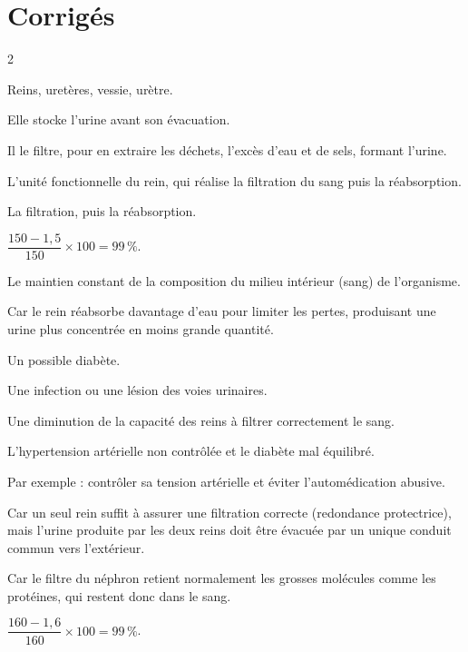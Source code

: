 \section{Corrigés}
\begin{multicols}{2}

Reins, uretères, vessie, urètre.

Elle stocke l'urine avant son évacuation.

Il le filtre, pour en extraire les déchets, l'excès d'eau et de sels, formant l'urine.

L'unité fonctionnelle du rein, qui réalise la filtration du sang puis la réabsorption.

La filtration, puis la réabsorption.

$\dfrac{150-1{,}5}{150}\times100=99\,\%$.

Le maintien constant de la composition du milieu intérieur (sang) de l'organisme.

Car le rein réabsorbe davantage d'eau pour limiter les pertes, produisant une urine plus
concentrée en moins grande quantité.

Un possible diabète.

Une infection ou une lésion des voies urinaires.

Une diminution de la capacité des reins à filtrer correctement le sang.

L'hypertension artérielle non contrôlée et le diabète mal équilibré.

Par exemple : contrôler sa tension artérielle et éviter l'automédication abusive.

Car un seul rein suffit à assurer une filtration correcte (redondance protectrice),
mais l'urine produite par les deux reins doit être évacuée par un unique conduit
commun vers l'extérieur.

Car le filtre du néphron retient normalement les grosses molécules comme les
protéines, qui restent donc dans le sang.

$\dfrac{160-1{,}6}{160}\times100=99\,\%$.


\end{multicols}
